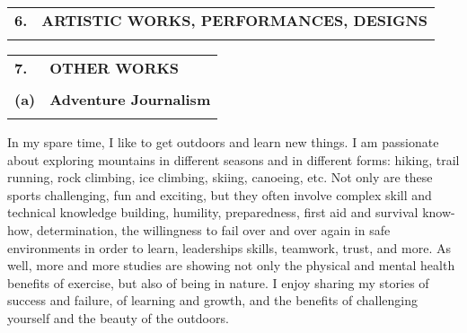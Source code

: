 \documentclass[11pt,notitlepage,english]{report}
\begin{document}
\begin{tabular}{L{.5cm} L{18.9cm} }
  \\
  \textbf{6.}  & \textbf{ARTISTIC WORKS, PERFORMANCES, DESIGNS}                                      \\
  \\
\end{tabular}

\begin{tabular}{L{.5cm} L{15.2cm} }
  \label{other_works}
  \\
  \textbf{7.}  & \textbf{OTHER WORKS}                                      \\
  \\
  \textbf{(a)} & \textbf{Adventure Journalism} \\
  \\
\end{tabular}

In my spare time, I like to get outdoors and learn new things. I am passionate
about exploring mountains in different seasons and in different forms: hiking,
trail running, rock climbing, ice climbing, skiing, canoeing, etc. Not only are
these sports challenging, fun and exciting, but they often involve complex
skill and technical knowledge building, humility, preparedness, first aid and
survival know-how, determination, the willingness to fail over and over again
in safe environments in order to learn, leaderships skills, teamwork, trust,
and more. As well, more and more studies are showing not only the physical and
mental health benefits of exercise, but also of being in nature. I enjoy
sharing my stories of success and failure, of learning and growth, and the
benefits of challenging yourself and the beauty of the outdoors.
\end{document}
